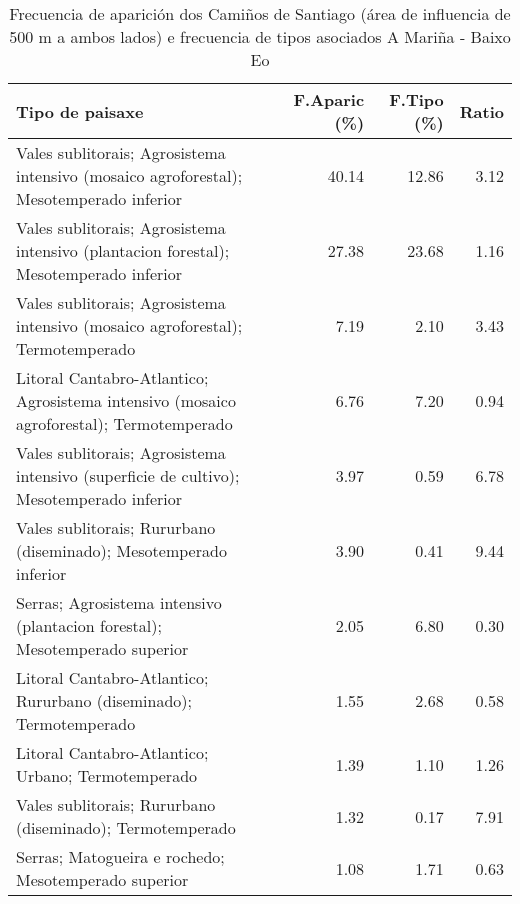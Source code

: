 \begin{table}[p]
\centering
\caption{Frecuencia de aparición dos Camiños de Santiago (área de influencia de 500 m a ambos lados) e frecuencia de tipos asociados A Mariña - Baixo Eo} 
\label{vcamino2}
\begin{tabular}{lrrr}
  \hline
Tipo de paisaxe & F.Aparic (\%) & F.Tipo (\%) & Ratio \\ 
  \hline
Vales sublitorais; Agrosistema intensivo (mosaico agroforestal); Mesotemperado inferior & 40.14 & 12.86 & 3.12 \\ 
  Vales sublitorais; Agrosistema intensivo (plantacion forestal); Mesotemperado inferior & 27.38 & 23.68 & 1.16 \\ 
  Vales sublitorais; Agrosistema intensivo (mosaico agroforestal); Termotemperado & 7.19 & 2.10 & 3.43 \\ 
  Litoral Cantabro-Atlantico; Agrosistema intensivo (mosaico agroforestal); Termotemperado & 6.76 & 7.20 & 0.94 \\ 
  Vales sublitorais; Agrosistema intensivo (superficie de cultivo); Mesotemperado inferior & 3.97 & 0.59 & 6.78 \\ 
  Vales sublitorais; Rururbano (diseminado); Mesotemperado inferior & 3.90 & 0.41 & 9.44 \\ 
  Serras; Agrosistema intensivo (plantacion forestal); Mesotemperado superior & 2.05 & 6.80 & 0.30 \\ 
  Litoral Cantabro-Atlantico; Rururbano (diseminado); Termotemperado & 1.55 & 2.68 & 0.58 \\ 
  Litoral Cantabro-Atlantico; Urbano; Termotemperado & 1.39 & 1.10 & 1.26 \\ 
  Vales sublitorais; Rururbano (diseminado); Termotemperado & 1.32 & 0.17 & 7.91 \\ 
  Serras; Matogueira e rochedo; Mesotemperado superior & 1.08 & 1.71 & 0.63 \\ 
   \hline
\end{tabular}
\end{table}
